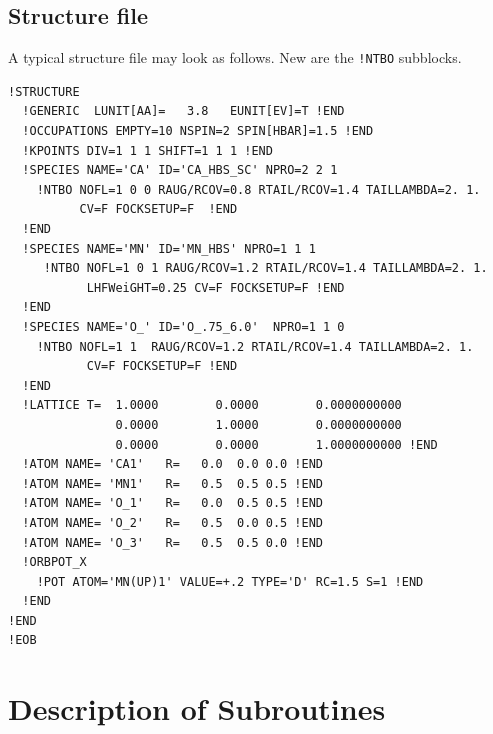 \documentclass[11pt,a4paper]{report}
\begin{document}
\subsection{Structure file}
A typical structure file may look as follows. New are the \verb|!NTBO|
subblocks.
\begin{verbatim}
!STRUCTURE 
  !GENERIC  LUNIT[AA]=   3.8   EUNIT[EV]=T !END
  !OCCUPATIONS EMPTY=10 NSPIN=2 SPIN[HBAR]=1.5 !END
  !KPOINTS DIV=1 1 1 SHIFT=1 1 1 !END
  !SPECIES NAME='CA' ID='CA_HBS_SC' NPRO=2 2 1 
    !NTBO NOFL=1 0 0 RAUG/RCOV=0.8 RTAIL/RCOV=1.4 TAILLAMBDA=2. 1.
          CV=F FOCKSETUP=F  !END 
  !END
  !SPECIES NAME='MN' ID='MN_HBS' NPRO=1 1 1 
     !NTBO NOFL=1 0 1 RAUG/RCOV=1.2 RTAIL/RCOV=1.4 TAILLAMBDA=2. 1.
           LHFWeiGHT=0.25 CV=F FOCKSETUP=F !END 
  !END
  !SPECIES NAME='O_' ID='O_.75_6.0'  NPRO=1 1 0
    !NTBO NOFL=1 1  RAUG/RCOV=1.2 RTAIL/RCOV=1.4 TAILLAMBDA=2. 1.
           CV=F FOCKSETUP=F !END 
  !END
  !LATTICE T=  1.0000        0.0000        0.0000000000
               0.0000        1.0000        0.0000000000
               0.0000        0.0000        1.0000000000 !END
  !ATOM NAME= 'CA1'   R=   0.0  0.0 0.0 !END
  !ATOM NAME= 'MN1'   R=   0.5  0.5 0.5 !END
  !ATOM NAME= 'O_1'   R=   0.0  0.5 0.5 !END
  !ATOM NAME= 'O_2'   R=   0.5  0.0 0.5 !END
  !ATOM NAME= 'O_3'   R=   0.5  0.5 0.0 !END
  !ORBPOT_X
    !POT ATOM='MN(UP)1' VALUE=+.2 TYPE='D' RC=1.5 S=1 !END
  !END
!END 
!EOB
\end{verbatim}



\section{Description of Subroutines}

\end{document}
